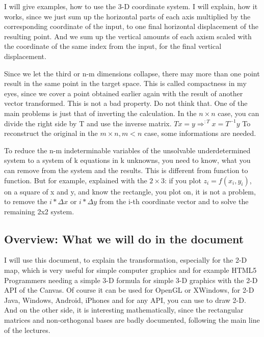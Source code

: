 \documentclass[a4paper]{article}
\begin{document}
I will give examples, how to use the 3-D coordinate system. I will explain, how it works, since we just sum up the horizontal parts of each axis multiplied by the corresponding coordinate of the input, to one final horizontal displacement of the resulting point. And we sum up the vertical amounts of each axism scaled with the coordinate of the same index from the input, for the final vertical displacement.

Since we let the third or n-m dimensions collapse, there may more than one point result in the same point in the target space. This is called compactness in my eyes, since we cover a point obtained earlier again with the result of another vector transformed. This is not a bad property. Do not think that. One of the main problems is just that of inverting the calculation. In the $n \times n$ case, you can divide the right side by T and use the inverse matrix. $Tx = y \Rightarrow^{:T} x = T^{-1}y$ To reconstruct the original in the $m \times n, m \lt n$ case, some informations are needed.


To reduce the n-m indeterminable variables of the unsolvable underdetermined system to a system of k equations in k unknowns, you need to know, what you can remove from the system and the results. This is different from function to function. But for example, explained with the $2 \times 3$: if you plot $z_i=f(x_i,y_i)$, on a square of x and y, and know the rectangle, you plot on, it is not a problem, to remove the $i*\Delta x$ or $i*\Delta y$ from the i-th coordinate vector and to solve the remaining 2x2 system. 

\subsection{Overview: What we will do in the document}

I will use this document, to explain the transformation, especially for the 2-D map, which is very useful for simple computer graphics and for example HTML5 Programmers needing a simple 3-D formula for simple 3-D graphics with the 2-D API of the Canvas.
Of course it can be used for OpenGL or XWindows, for 2-D Java, Windows, Android, iPhones and for any API, you can use to draw 2-D.
And on the other side, it is interesting mathematically, since the rectangular matrices and non-orthogonal bases are badly documented, following the main line of the lectures.
\end{document}
